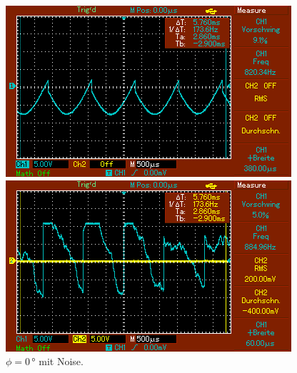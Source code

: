 \begin{figure}[h]
    \begin{minipage}[b]{.45\linewidth} %
       \includegraphics[width=\linewidth]{bilder/MAP007.png}
       \caption{$\phi = 120\,\unit{°}$.}
    \end{minipage}
    \hspace{0.1\linewidth}%
    \begin{minipage}[b]{.45\linewidth} %
       \includegraphics[width=\linewidth]{bilder/MAP011.png}
       \caption{$\phi = 0\,\unit{°}$ mit Noise.}
    \end{minipage}
\end{figure}

